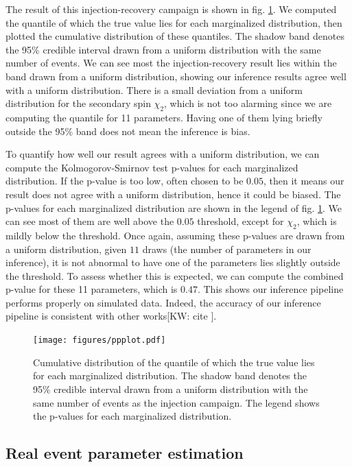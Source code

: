 \documentclass[twocolumn]{aastex631}
\newcommand{\kw}[1]{{\color{rb4}[KW: #1 ]}}
\begin{document}
The result of this injection-recovery campaign is shown in fig. \ref{fig:ppplot}. We
computed the quantile of which the true value lies for each marginalized
distribution, then plotted the cumulative distribution of these quantiles. The
shadow band denotes the 95\% credible interval drawn from a uniform distribution
with the same number of events. We can see most the injection-recovery result
lies within the band drawn from a uniform distribution, showing our inference
results agree well with a uniform distribution. There is a small deviation from
a uniform distribution for the secondary spin $\chi_2$, which is not too
alarming since we are computing the quantile for 11 parameters. Having one of
them lying briefly outside the 95\% band does not mean the inference is bias.

To quantify how well our result agrees with a uniform distribution, we can
compute the Kolmogorov-Smirnov test p-values for each marginalized distribution.
If the p-value is too low, often chosen to be $0.05$, then it means our result
does not agree with a uniform distribution, hence it could be biased. The
p-values for each marginalized distribution are shown in the legend of fig.
\ref{fig:ppplot}. We can see most of them are well above the $0.05$ threshold,
except for $\chi_2$, which is mildly below the threshold. Once again, assuming
these p-values are drawn from a uniform distribution, given $11$ draws (the
number of parameters in our inference), it is not abnormal to have one of the
parameters lies slightly outside the threshold. To assess whether this is
expected, we can compute the combined p-value for these 11 parameters, which is $0.47$.
This shows our inference pipeline performs properly on simulated data.
Indeed, the accuracy of our inference pipeline is consistent with other works\kw{cite}.

\begin{figure}
    \texttt{[image: figures/ppplot.pdf]}
    \caption{Cumulative distribution of the quantile of which the true value
    lies for each marginalized distribution. The shadow band denotes the 95\%
    credible interval drawn from a uniform distribution with the same number of
    events as the injection campaign. The legend shows the p-values for each
    marginalized distribution.}
    \label{fig:ppplot}
    \end{figure}

\subsection{Real event parameter estimation}
\end{document}
